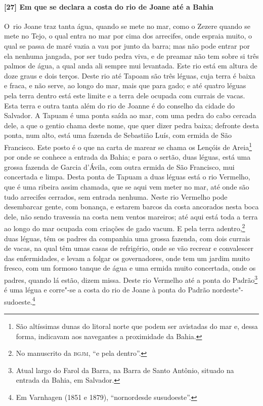 \begin{linenumbers}
\paragraph{[27] Em que se declara a costa do rio de Joane até a Bahia} \quad
\mbox{O rio} Joane traz tanta água, quando se mete no mar, como o Zezere quando se mete no Tejo,
o qual entra no mar por cima dos arrecifes, onde espraia muito, o qual se passa de maré
vazia a vau por junto da barra; mas não pode entrar por ela nenhuma jangada, por ser tudo
pedra viva, e de preamar não tem sobre si três palmos de água, a qual anda ali sempre mui
levantada. Este rio está em altura de doze graus e dois terços. Deste rio até Tapoam são
três léguas, cuja terra é baixa e fraca, e não serve, ao longo do mar, mais que para gado;
e até quatro léguas pela terra dentro está este limite e a terra dele ocupada com currais
de vacas. Esta terra e outra tanta além do rio de Joanne é do conselho da cidade do
Salvador. A Tapuam é uma ponta saída ao mar, com uma pedra do cabo cercada dele, a que o
gentio chama deste nome, que quer dizer pedra baixa; defronte desta ponta, num alto, está
uma fazenda de Sebastião Luís, com ermida de São Francisco. Este posto é o que na carta de
marear se chama os Lençóis de Areia\footnote{ São altíssimas dunas do litoral norte que
podem ser avistadas do mar e, dessa forma, indicavam aos navegantes a proximidade da
Bahia.} por onde se conhece a entrada da Bahia; e para o sertão, duas léguas, está uma
grossa fazenda de Garcia d'Ávila, com outra ermida de São Francisco, mui concertada e
limpa. Desta ponta de Tapuam a duas léguas está o rio Vermelho, que é uma ribeira assim
chamada, que se aqui vem meter no mar, até onde são tudo arrecifes cerrados, sem entrada
nenhuma. Neste rio Vermelho pode desembarcar gente, com bonança, e estarem barcos da costa
ancorados nesta boca dele, não sendo travessia na costa nem ventos mareiros; até aqui está
toda a terra ao longo do mar ocupada com criações de gado vacum. E pela terra
adentro,\footnote{ No manuscrito da \textsc{bgjm}, ``e pela dentro''.} duas léguas, têm os
padres da companhia uma grossa fazenda, com dois currais de vacas, na qual têm umas casas
de refrigério, onde se vão recrear e convalescer das enfermidades, e levam a folgar os
governadores, onde tem um jardim muito fresco, com um formoso tanque de água e uma ermida
muito concertada, onde os padres, quando lá estão, dizem missa. Deste rio Vermelho até a
ponta do Padrão\footnote{ Atual largo do Farol da Barra, na Barra de Santo Antônio,
situado na entrada da Bahia, em Salvador.} é uma légua e corre"-se a costa do rio de Joane
à ponta do Padrão nordeste"-sudoeste.\footnote{ Em Varnhagen (1851 e 1879), ``nornordesde
susudoeste''.}


\end{linenumbers}
